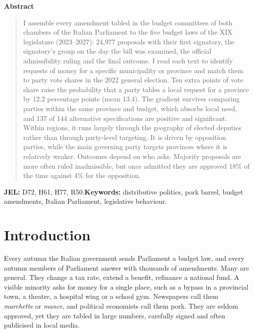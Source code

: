 \documentclass[12pt]{article}
\begin{document}
\begin{center}
\textbf{Abstract}
\end{center}
\begin{quote}\small
I assemble every amendment tabled in the budget committees of both chambers of the Italian Parliament to the five budget laws of the XIX legislature (2023--2027): 24,977 proposals with their first signatory, the signatory's group on the day the bill was examined, the official admissibility ruling and the final outcome. I read each text to identify requests of money for a specific municipality or province and match them to party vote shares in the 2022 general election. Ten extra points of vote share raise the probability that a party tables a local request for a province by 12.2 percentage points (mean 13.4). The gradient survives comparing parties within the same province and budget, which absorbs local need, and 137 of 144 alternative specifications are positive and significant. Within regions, it runs largely through the geography of elected deputies rather than through party-level targeting. It is driven by opposition parties, while the main governing party targets provinces where it is relatively weaker. Outcomes depend on who asks. Majority proposals are more often ruled inadmissible, but once admitted they are approved 18\% of the time against 4\% for the opposition.
\end{quote}
\vspace{4pt}
\noindent\textbf{JEL:} D72, H61, H77, R50.\quad \textbf{Keywords:} distributive politics, pork barrel, budget amendments, Italian Parliament, legislative behaviour.

\newpage
\onehalfspacing

\section{Introduction}

Every autumn the Italian government sends Parliament a budget law, and every autumn members of Parliament answer with thousands of amendments. Many are general. They change a tax rate, extend a benefit, refinance a national fund. A visible minority asks for money for a single place, such as a bypass in a provincial town, a theatre, a hospital wing or a school gym. Newspapers call them \emph{marchette} or \emph{mance}, and political economists call them pork. They are seldom approved, yet they are tabled in large numbers, carefully signed and often publicised in local media.
\end{document}
